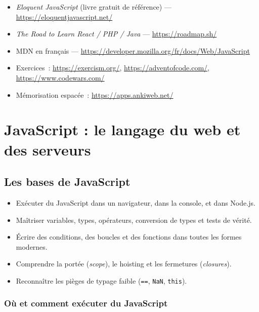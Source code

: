 \documentclass[12pt,a4paper,twoside,openright]{book}
\begin{document}
\begin{ressources}
\begin{itemize}
  \item \emph{Eloquent JavaScript} (livre gratuit de r\'ef\'erence) --- \url{https://eloquentjavascript.net/}
  \item \emph{The Road to Learn React / PHP / Java} --- \url{https://roadmap.sh/}
  \item MDN en fran\c{c}ais --- \url{https://developer.mozilla.org/fr/docs/Web/JavaScript}
  \item Exercices~: \url{https://exercism.org/}, \url{https://adventofcode.com/}, \url{https://www.codewars.com/}
  \item M\'emorisation espac\'ee~: \url{https://apps.ankiweb.net/}
\end{itemize}
\end{ressources}

\part{JavaScript : le langage du web et des serveurs}
\chapter{Les bases de JavaScript}
\label{ch-js-bases}

\begin{objectif}
\begin{itemize}
  \item Ex\'ecuter du JavaScript dans un navigateur, dans la console, et dans Node.js.
  \item Ma\^itriser variables, types, op\'erateurs, conversion de types et tests de v\'erit\'e.
  \item \'Ecrire des conditions, des boucles et des fonctions dans toutes les formes modernes.
  \item Comprendre la port\'ee (\emph{scope}), le hoisting et les fermetures (\emph{closures}).
  \item Reconna\^itre les pi\`eges de typage faible (\verb|==|, \verb|NaN|, \verb|this|).
\end{itemize}
\end{objectif}

\section{O\`u et comment ex\'ecuter du JavaScript}
\end{document}
